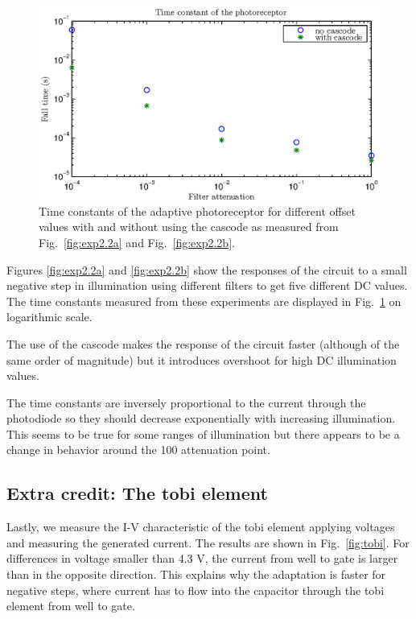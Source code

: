 \begin{figure}[H]
	\center
	\includegraphics{exp2_2c.eps}
	\caption{Time constants of the adaptive photoreceptor for different offset values with and without using the cascode as measured from Fig.~\ref{fig:exp2.2a} and Fig.~\ref{fig:exp2.2b}.}
	\label{fig:exp2.2c}
\end{figure}

Figures \ref{fig:exp2.2a} and \ref{fig:exp2.2b} show the responses of the circuit to a small negative step in illumination using different filters to get five different DC values. The time constants measured from these experiments are displayed in Fig.~\ref{fig:exp2.2c} on logarithmic scale. 

The use of the cascode makes the response of the circuit faster (although of the same order of magnitude) but it introduces overshoot for high DC illumination values. 

The time constants are inversely proportional to the current through the photodiode so they should decrease exponentially with increasing illumination. This seems to be true for some ranges of illumination but there appears to be a change in behavior around the 100 attenuation point. \\

\subsection{Extra credit: The tobi element}
Lastly, we measure the I-V characteristic of the tobi element applying voltages and measuring the generated current. The results are shown in Fig.~\ref{fig:tobi}. For differences in voltage smaller than 4.3 V, the current from well to gate is larger than in the opposite direction. This explains why the adaptation is faster for negative steps, where current has to flow into the capacitor through the tobi element from well to gate.

